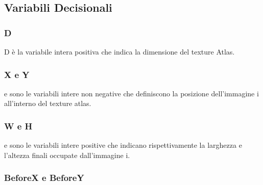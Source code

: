 \newcommand{\footBleeding}{L'effetto bleeding si può manifestare nei programmi che sfruttano l'accelerazione hardware. In essi i pixel vengono presi con delle coordinate reali in [0,1] e i pixel subito fuori dall'immagine possono "sporcare" quelli di contorno. Perciò si ricopiano questi ultimi in un bordo di 1 pixel attorno a tutta l'immagine.}
\newcommand{\footRotation}{Alcuni programmi (soprattutto quelli che sfruttano l'accelerazione hardware) possono renderizzare le texture in modo giusto anche se sull'immagine originaria sono ruotate, mentre altri potrebbero avere problemi.}
\newcommand{\footTwoPowers}{Alcune librerie spesso esigono immagini quadrate il cui lato dev'essere una potenza di 2.}

\newcommand{\footFreedom}{L'utente in verità ha la libertà di usare queste variabili per mettere valori a piacere, non necessariamente potenze di 2.}

\newcommand{\footIsTSum}{Essendo variabili di uguaglianza su una stessa variabile D, questa somma può essere al massimo 1.}





\subsection{Variabili Decisionali}

\subsubsection{D}
D è la variabile intera positiva che indica la dimensione del texture Atlas.

\subsubsection{X e Y}
\Xi{} e \Yi{} sono le variabili intere non negative che definiscono la posizione dell'immagine i all'interno del texture atlas.

\subsubsection{W e H}
\Wi{} e \Hi{} sono le variabili intere positive che indicano rispettivamente la larghezza e l'altezza finali occupate dall'immagine i.


\subsubsection{BeforeX e BeforeY}


